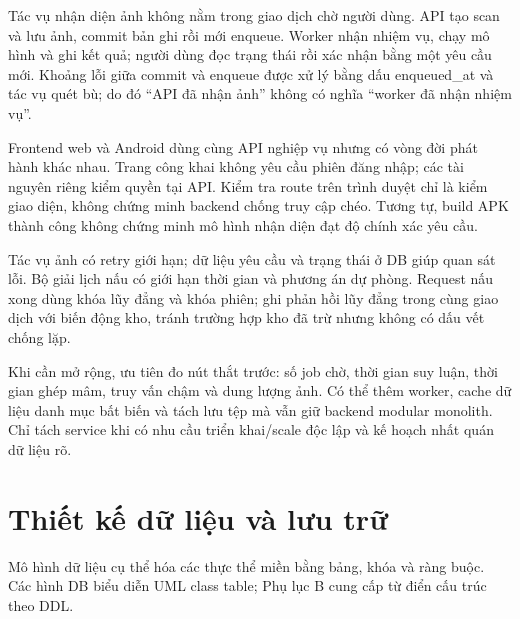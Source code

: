 Tác vụ nhận diện ảnh không nằm trong giao dịch chờ người dùng. API tạo scan và lưu ảnh, commit bản ghi rồi mới enqueue. Worker nhận nhiệm vụ, chạy mô hình và ghi kết quả; người dùng đọc trạng thái rồi xác nhận bằng một yêu cầu mới. Khoảng lỗi giữa commit và enqueue được xử lý bằng dấu enqueued\_\allowbreak{}at và tác vụ quét bù; do đó ``API đã nhận ảnh'' không có nghĩa ``worker đã nhận nhiệm vụ''.

Frontend web và Android dùng cùng API nghiệp vụ nhưng có vòng đời phát hành khác nhau. Trang công khai không yêu cầu phiên đăng nhập; các tài nguyên riêng kiểm quyền tại API. Kiểm tra route trên trình duyệt chỉ là kiểm giao diện, không chứng minh backend chống truy cập chéo. Tương tự, build APK thành công không chứng minh mô hình nhận diện đạt độ chính xác yêu cầu.

Tác vụ ảnh có retry giới hạn; dữ liệu yêu cầu và trạng thái ở DB giúp quan sát lỗi. Bộ giải lịch nấu có giới hạn thời gian và phương án dự phòng. Request nấu xong dùng khóa lũy đẳng và khóa phiên; ghi phản hồi lũy đẳng trong cùng giao dịch với biến động kho, tránh trường hợp kho đã trừ nhưng không có dấu vết chống lặp.

Khi cần mở rộng, ưu tiên đo nút thắt trước: số job chờ, thời gian suy luận, thời gian ghép mâm, truy vấn chậm và dung lượng ảnh. Có thể thêm worker, cache dữ liệu danh mục bất biến và tách lưu tệp mà vẫn giữ backend modular monolith. Chỉ tách service khi có nhu cầu triển khai/\allowbreak{}scale độc lập và kế hoạch nhất quán dữ liệu rõ.

\section{Thiết kế dữ liệu và lưu trữ}
Mô hình dữ liệu cụ thể hóa các thực thể miền bằng bảng, khóa và ràng buộc. Các hình DB biểu diễn UML class \guillemotleft{}table\guillemotright{}; Phụ lục B cung cấp từ điển cấu trúc theo DDL.

